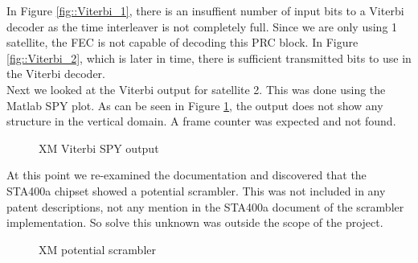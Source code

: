 \documentclass[conference,onecolumn]{IEEEtran}
\begin{document}
In Figure \ref{fig::Viterbi_1}, there is an insuffient number of input bits to a Viterbi decoder as the time interleaver is not completely full.  Since we are only using 1 satellite, the FEC is not capable of decoding this PRC block.  In Figure \ref{fig::Viterbi_2}, which is later in time, there is sufficient transmitted bits to use in the Viterbi decoder.\\

Next we looked at the Viterbi output for satellite 2.  This was done using the Matlab SPY plot.  As can be seen in Figure \ref{fig::Viterbi_spy}, the output does not show any structure in the vertical domain.  A frame counter was expected and not found.  
\begin{figure}[H]
	\centerline{}
	\caption{XM Viterbi SPY output}
	\label{fig::Viterbi_spy}
\end{figure}
At this point we re-examined the documentation and discovered that the STA400a chipset showed a potential scrambler.  This was not included in any patent descriptions, not any mention in the STA400a document of the scrambler implementation.  So solve this unknown was outside the scope of the project.

\begin{figure}[H]
	\centerline{}
	\caption{XM potential scrambler}
	\label{fig::scrambler}
\end{figure}
\end{document}
